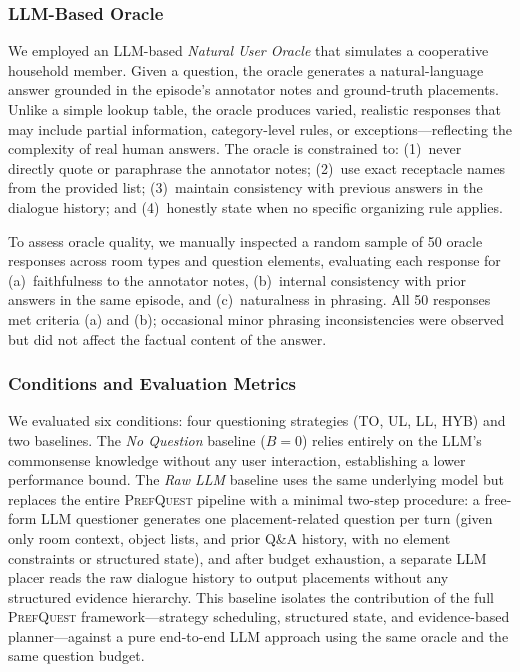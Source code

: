 \documentclass[manuscript,review,anonymous]{acmart}
\begin{document}
{\subsubsection{LLM-Based Oracle}

We employed an LLM-based \textit{Natural User Oracle} that simulates a cooperative household member. Given a question, the oracle generates a natural-language answer grounded in the episode's annotator notes and ground-truth placements. Unlike a simple lookup table, the oracle produces varied, realistic responses that may include partial information, category-level rules, or exceptions---reflecting the complexity of real human answers. The oracle is constrained to: (1)~never directly quote or paraphrase the annotator notes; (2)~use exact receptacle names from the provided list; (3)~maintain consistency with previous answers in the dialogue history; and (4)~honestly state when no specific organizing rule applies.

To assess oracle quality, we manually inspected a random sample of 50 oracle responses across room types and question elements, evaluating each response for (a)~faithfulness to the annotator notes, (b)~internal consistency with prior answers in the same episode, and (c)~naturalness in phrasing. All 50 responses met criteria (a) and (b); occasional minor phrasing inconsistencies were observed but did not affect the factual content of the answer.

\subsubsection{Conditions and Evaluation Metrics}

We evaluated six conditions: four questioning strategies (TO, UL, LL, HYB) and two baselines. The \textit{No Question} baseline ($B=0$) relies entirely on the LLM's commonsense knowledge without any user interaction, establishing a lower performance bound. The \textit{Raw LLM} baseline uses the same underlying model but replaces the entire \textsc{PrefQuest} pipeline with a minimal two-step procedure: a free-form LLM questioner generates one placement-related question per turn (given only room context, object lists, and prior Q\&A history, with no element constraints or structured state), and after budget exhaustion, a separate LLM placer reads the raw dialogue history to output placements without any structured evidence hierarchy. This baseline isolates the contribution of the full \textsc{PrefQuest} framework---strategy scheduling, structured state, and evidence-based planner---against a pure end-to-end LLM approach using the same oracle and the same question budget.

}
\end{document}

